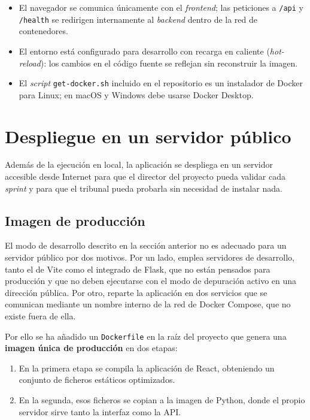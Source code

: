 \begin{itemize}
	\item El navegador se comunica únicamente con el \textit{frontend}; las peticiones a
		\texttt{/api} y \texttt{/health} se redirigen internamente al \textit{backend} dentro de la
		red de contenedores.
	\item El entorno está configurado para desarrollo con recarga en caliente
		(\textit{hot-reload}): los cambios en el código fuente se reflejan sin reconstruir la imagen.
	\item El \textit{script} \texttt{get-docker.sh} incluido en el repositorio es un instalador de
		Docker para Linux; en macOS y Windows debe usarse Docker Desktop.
\end{itemize}

\section{Despliegue en un servidor público}
\label{sec:despliegue}

Además de la ejecución en local, la aplicación se despliega en un servidor accesible desde Internet
para que el director del proyecto pueda validar cada \textit{sprint} y para que el tribunal pueda
probarla sin necesidad de instalar nada.

\subsection{Imagen de producción}

El modo de desarrollo descrito en la sección anterior no es adecuado para un servidor público por dos
motivos. Por un lado, emplea servidores de desarrollo, tanto el de Vite como el integrado de Flask,
que no están pensados para producción y que no deben ejecutarse con el modo de depuración activo en
una dirección pública. Por otro, reparte la aplicación en dos servicios que se comunican mediante un
nombre interno de la red de Docker Compose, que no existe fuera de ella.

Por ello se ha añadido un \texttt{Dockerfile} en la raíz del proyecto que genera una \textbf{imagen
única de producción} en dos etapas:

\begin{enumerate}
	\item En la primera etapa se compila la aplicación de React, obteniendo un conjunto de ficheros
		estáticos optimizados.
	\item En la segunda, esos ficheros se copian a la imagen de Python, donde el propio servidor sirve
		tanto la interfaz como la API.
\end{enumerate}


